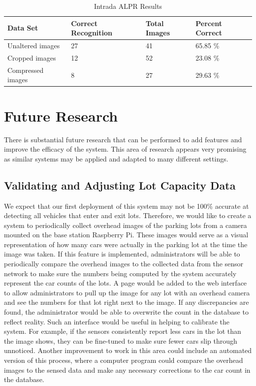 \documentclass[11pt, oneside, fullpage, doublespace]{article}
\begin{document}
\begin{table}[h!]
\begin{center}
\begin{tabular}{| l || l | l | l |}
\hline
Data Set & Correct Recognition & Total Images & Percent Correct \\ \hline
Unaltered images & 27 & 41 & 65.85 \% \\ \hline
Cropped images & 12 & 52 & 23.08 \% \\ \hline
Compressed images & 8 & 27 & 29.63 \% \\ \hline
\end{tabular}
\end{center}
\caption{Intrada ALPR Results}
\end{table}

\section{Future Research}
There is substantial future research that can be performed to add features and improve the efficacy of the system. This area of research appears very promising as similar systems may be applied and adapted to many different settings.

\subsection{Validating and Adjusting Lot Capacity Data}
We expect that our first deployment of this system may not be 100\% accurate at detecting all vehicles that enter and exit lots. Therefore, we would like to create a system to periodically collect overhead images of the parking lots from a camera mounted on the base station Raspberry Pi. These images would serve as a visual representation of how many cars were actually in the parking lot at the time the image was taken. If this feature is implemented, administrators will be able to periodically compare the overhead images to the collected data from the sensor network to make sure the numbers being computed by the system accurately represent the car counts of the lots. A page would be added to the web interface to allow administrators to pull up the image for any lot with an overhead camera and see the numbers for that lot right next to the image. If any discrepancies are found, the administrator would be able to overwrite the count in the database to reflect reality. Such an interface would be useful in helping to calibrate the system. For example, if the sensors consistently report less cars in the lot than the image shows, they can be fine-tuned to make sure fewer cars slip through unnoticed. Another improvement to work in this area could include an automated version of this process, where a computer program could compare the overhead images to the sensed data and make any necessary corrections to the car count in the database.
\end{document}
